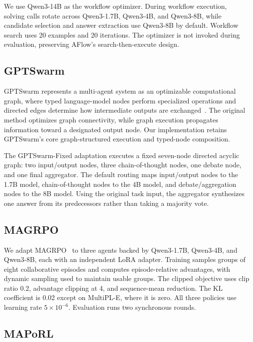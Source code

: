 We use Qwen3-14B as the workflow optimizer. During workflow execution, solving calls rotate across Qwen3-1.7B, Qwen3-4B, and Qwen3-8B, while candidate selection and answer extraction use Qwen3-8B by default. Workflow search uses 20 examples and 20 iterations. The optimizer is not invoked during evaluation, preserving AFlow's search-then-execute design.

\subsection{GPTSwarm}

GPTSwarm represents a multi-agent system as an optimizable computational graph, where typed language-model nodes perform specialized operations and directed edges determine how intermediate outputs are exchanged~\citep{zhuge2024gptswarm}. The original method optimizes graph connectivity, while graph execution propagates information toward a designated output node. Our implementation retains GPTSwarm's core graph-structured execution and typed-node composition.

The GPTSwarm-Fixed adaptation executes a fixed seven-node directed acyclic graph: two input/output nodes, three chain-of-thought nodes, one debate node, and one final aggregator. The default routing maps input/output nodes to the 1.7B model, chain-of-thought nodes to the 4B model, and debate/aggregation nodes to the 8B model. Using the original task input, the aggregator synthesizes one answer from its predecessors rather than taking a majority vote.

\subsection{MAGRPO}

We adapt MAGRPO~\citep{liu2026collaboration} to three agents backed by Qwen3-1.7B, Qwen3-4B, and Qwen3-8B, each with an independent LoRA adapter. Training samples groups of eight collaborative episodes and computes episode-relative advantages, with dynamic sampling used to maintain usable groups. The clipped objective uses clip ratio 0.2, advantage clipping at 4, and sequence-mean reduction. The KL coefficient is 0.02 except on MultiPL-E, where it is zero. All three policies use learning rate $5{\times}10^{-6}$. Evaluation runs two synchronous rounds.

\subsection{MAPoRL}

